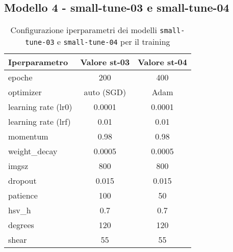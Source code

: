 \subsection*{Modello 4 - small-tune-03 e small-tune-04}




\begin{table}[!htb]
    \centering
    \begin{tabular}{lcc}
        \hline
        \textbf{Iperparametro} & \textbf{Valore st-03} & \textbf{Valore st-04}\\
        \hline
        epoche & 200 & 400 \\
        optimizer & auto (SGD) & Adam \\
        learning rate (lr0) & 0.0001 & 0.0001\\
        learning rate (lrf) & 0.01 & 0.01 \\
        momentum & 0.98 & 0.98\\
        weight\_decay & 0.0005 & 0.0005\\
        imgsz & 800 & 800 \\
        dropout & 0.015 & 0.015 \\
        patience & 100 & 50\\
        \midrule
        hsv\_h & 0.7 & 0.7 \\
        degrees & 120 & 120 \\
        shear & 55 & 55 \\
        \hline
    \end{tabular}
    \caption{Configurazione iperparametri dei modelli \texttt{small-tune-03} e \texttt{small-tune-04} per il training}
    \label{tab:v4-model-configs}
    \end{table}

    


